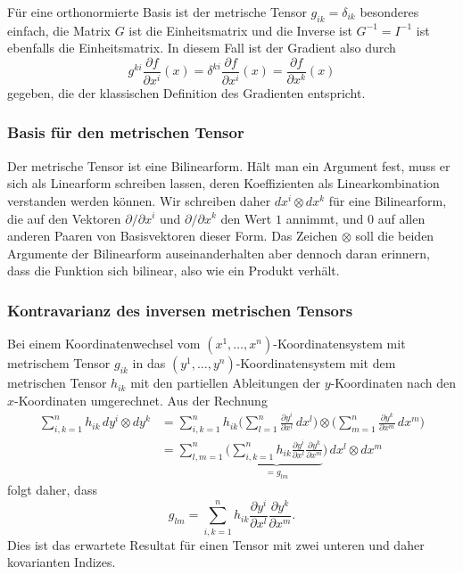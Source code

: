 Für eine orthonormierte Basis ist der metrische Tensor $g_{ik}=\delta_{ik}$
besonderes einfach, die Matrix $G$ ist die Einheitsmatrix und die 
Inverse ist $G^{-1}=I^{-1}$ ist ebenfalls die Einheitsmatrix.
In diesem Fall ist der Gradient also durch
\[
g^{ki}\frac{\partial f}{\partial x^i}(x)
=
\delta^{ki}\frac{\partial f}{\partial x^i}(x)
=
\frac{\partial f}{\partial x^k}(x)
\]
gegeben, die der klassischen Definition des Gradienten entspricht.

%
%
\subsubsection{Basis für den metrischen Tensor}
Der metrische Tensor ist eine Bilinearform.
Hält man ein Argument fest, muss er sich als Linearform schreiben lassen,
deren Koeffizienten als Linearkombination verstanden werden können.
Wir schreiben daher $dx^i\otimes dx^k$ für eine Bilinearform, die auf
%
den Vektoren $\partial/\partial x^i$ und $\partial/\partial x^k$ den
Wert $1$ annimmt, und $0$ auf allen anderen Paaren von Basisvektoren
dieser Form.
Das Zeichen $\otimes$ soll die beiden Argumente der Bilinearform
auseinanderhalten aber dennoch daran erinnern, dass die Funktion
sich bilinear, also wie ein Produkt verhält.

%
%
\subsubsection{Kontravarianz des inversen metrischen Tensors}
Bei einem Koordinatenwechsel vom $(x^1,\dots,x^n)$-Koordinatensystem
mit metrischem Tensor $g_{ik}$ in das $(y^1,\dots,y^n)$-Koordinatensystem
mit dem metrischen Tensor $h_{ik}$ mit den partiellen Ableitungen
der $y$-Koordinaten nach den $x$-Koordinaten umgerechnet.
Aus der Rechnung
\begin{align*}
\sum_{i,k=1}^n
h_{ik} \, dy^i \otimes dy^k
&=
\sum_{i,k=1}^n
h_{ik}
\biggl(\sum_{l=1}^n \frac{\partial y^i}{\partial x^l}\, dx^l \biggr)
\otimes
\biggl(\sum_{m=1}^n \frac{\partial y^k}{\partial x^m}\, dx^m \biggr)
\\
&=
\sum_{l,m=1}^n
\biggl(
\underbrace{
\sum_{i,k=1}^n h_{ik}
\frac{\partial y^i}{\partial x^l}
\frac{\partial y^k}{\partial x^m}
}_{\displaystyle = g_{lm}}
\biggr)
\,
dx^l\otimes dx^m
\end{align*}
folgt daher, dass
\begin{equation}
g_{lm}
=
\sum_{i,k=1}^n h_{ik}
\frac{\partial y^i}{\partial x^l}
\frac{\partial y^k}{\partial x^m}.
\label{buch:kurvenintegral:differential:eqn:gkovarianz}
\end{equation}
Dies ist das erwartete Resultat für einen Tensor mit zwei unteren 
und daher kovarianten Indizes.

